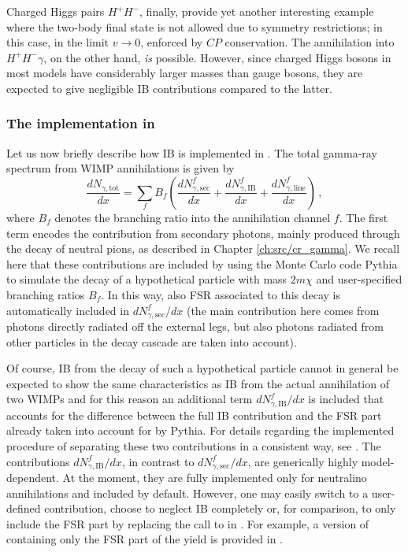 Charged Higgs pairs $H^+H^-$, finally, provide yet another interesting example 
where the two-body final state is not allowed due to symmetry restrictions; in this 
case, in the limit $v\rightarrow0$, enforced by  $CP$ conservation. The 
annihilation into $H^+H^-\gamma$, on the other hand, \emph{is} possible. However, 
since charged Higgs bosons in most models have considerably larger masses than 
gauge bosons, they are expected to give negligible IB contributions compared to the 
latter.

\subsubsection{The implementation in \ds}

Let us now briefly describe how  IB is implemented in \ds. The total gamma-ray 
spectrum  from WIMP annihilations is given by
\begin{equation}
  \frac{dN_{\gamma,\mathrm{tot}}}{dx}=\sum_f 
B_f\left(\frac{dN^f_{\gamma,\mathrm{sec}}}{dx}+\frac{dN^f_{\gamma,\mathrm{IB}}}{dx} 
+ \frac{dN^f_{\gamma,\mathrm{line}}}{dx}\right)\,,
\end{equation}
where $B_f$ denotes the branching ratio into the annihilation channel $f$. The 
first term encodes the contribution from secondary photons, mainly produced through 
the decay of neutral pions, as described in Chapter \ref{ch:src/cr_gamma}.
 We recall here that these contributions are included by using the Monte Carlo code 
{\sf Pythia} \cite{Sjostrand:2006za} to simulate the decay of a hypothetical particle with 
mass 
$2m\chi$ and user-specified branching ratios $B_f$.  In this way, also FSR 
associated to this decay  is automatically included in 
${dN^f_{\gamma,\mathrm{sec}}}/{dx}$ (the main contribution here comes from photons 
directly radiated off the external legs, but also photons radiated from other 
particles in the decay cascade are taken into account). 

Of course, IB from the decay of such a hypothetical particle cannot in general be 
expected  to show the same characteristics as IB from the actual annihilation of 
two WIMPs and for this reason an additional term ${dN^f_{\gamma,\mathrm{IB}}}/{dx}$ 
is included that accounts for the difference between the full IB contribution and 
the FSR part already taken into account for by {\sf Pythia}. For details regarding 
the 
implemented procedure of separating these two contributions in a consistent way, 
see \cite{Bringmann:2007nk}.
The contributions ${dN^f_{\gamma,\mathrm{IB}}}/{dx}$, in contrast to 
${dN^f_{\gamma,\mathrm{sec}}}/{dx}$, are generically highly model-dependent. At the 
moment, they are fully implemented only for neutralino annihilations and included 
by default. However, one may easily switch to a user-defined contribution, choose 
to neglect IB completely or, for comparison, to only include the FSR part 
by replacing the call to  in .
For example, a version of   containing only the FSR part
of the yield is provided in .


